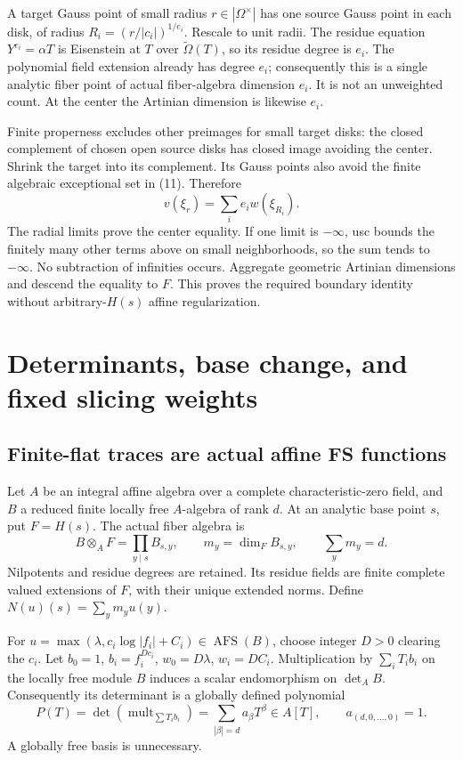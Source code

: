 \documentclass[
  11pt,
]{article}
\begin{document}
A target Gauss point of small radius \(r\in|\Omega^\times|\) has one
source Gauss point in each disk, of radius \(R_i=(r/|c_i|)^{1/e_i}\).
Rescale to unit radii. The residue equation \(Y^{e_i}=\alpha T\) is
Eisenstein at \(T\) over \(\widetilde\Omega(T)\), so its residue degree
is \(e_i\). The polynomial field extension already has degree \(e_i\);
consequently this is a single analytic fiber point of actual
fiber-algebra dimension \(e_i\). It is not an unweighted count. At the
center the Artinian dimension is likewise \(e_i\).

Finite properness excludes other preimages for small target disks: the
closed complement of chosen open source disks has closed image avoiding
the center. Shrink the target into its complement. Its Gauss points also
avoid the finite algebraic exceptional set in (11). Therefore
\[v(\xi_r)=\sum_i e_iw(\xi_{R_i}).\] The radial limits prove the center
equality. If one limit is \(-\infty\), usc bounds the finitely many
other terms above on small neighborhoods, so the sum tends to
\(-\infty\). No subtraction of infinities occurs. Aggregate geometric
Artinian dimensions and descend the equality to \(F\). This proves the
required boundary identity without arbitrary-\(H(s)\) affine
regularization.

\section{Determinants, base change, and fixed slicing
weights}\label{determinants-base-change-and-fixed-slicing-weights}

\subsection{Finite-flat traces are actual affine FS
functions}\label{finite-flat-traces-are-actual-affine-fs-functions}

Let \(A\) be an integral affine algebra over a complete
characteristic-zero field, and \(B\) a reduced finite locally free
\(A\)-algebra of rank \(d\). At an analytic base point \(s\), put
\(F=H(s)\). The actual fiber algebra is
\[B\otimes_A F=\prod_{y\mid s} B_{s,y},\qquad
 m_y=\dim_F B_{s,y},\qquad\sum_y m_y=d.\] Nilpotents and residue degrees
are retained. Its residue fields are finite complete valued extensions
of \(F\), with their unique extended norms. Define
\(N(u)(s)=\sum_y m_yu(y)\).

For \(u=\max(\lambda,c_i\log|f_i|+C_i)\in\operatorname{AFS}(B)\), choose
integer \(D>0\) clearing the \(c_i\). Let \(b_0=1\), \(b_i=f_i^{Dc_i}\),
\(w_0=D\lambda\), \(w_i=DC_i\). Multiplication by \(\sum_iT_i b_i\) on
the locally free module \(B\) induces a scalar endomorphism on
\(\det_A B\). Consequently its determinant is a globally defined
polynomial \[P(T)=\det(\operatorname{mult}_{\sum T_i b_i})
      =\sum_{|\beta|=d}a_\beta T^\beta\in A[T],\qquad a_{(d,0,\ldots,0)}=1. \tag{12}\]
A globally free basis is unnecessary.
\end{document}
